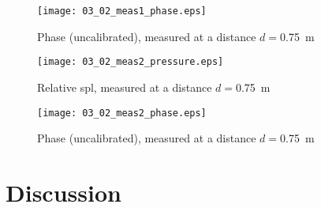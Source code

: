 \begin{figure}[htbp]
	\centering
	\texttt{[image: 03\_02\_meas1\_phase.eps]}
	\caption{Phase (uncalibrated), measured at a distance \(d=\)\SI{0.75}{\meter}}
		\label{fig:03_02_m1_phase}
\end{figure}

\begin{figure}[htbp]
	\centering
	\texttt{[image: 03\_02\_meas2\_pressure.eps]}
	\caption{Relative \gls{spl}, measured at a distance \(d=\)\SI{0.75}{\meter}}
		\label{fig:03_02_m2_pressure}
\end{figure}

\begin{figure}[htbp]
	\centering
	\texttt{[image: 03\_02\_meas2\_phase.eps]}
	\caption{Phase (uncalibrated), measured at a distance \(d=\)\SI{0.75}{\meter}}
		\label{fig:02_23_m2_phase}
\end{figure}

\section*{Discussion}